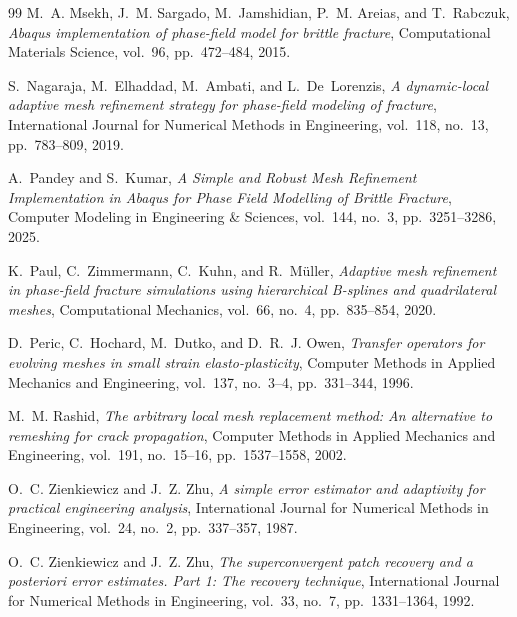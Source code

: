 \begin{thebibliography}{99}
M.~A. Msekh, J.~M. Sargado, M.~Jamshidian, P.~M. Areias, and T.~Rabczuk,
\textit{Abaqus implementation of phase-field model for brittle fracture},
Computational Materials Science,
vol.~96, pp.~472--484, 2015.

S.~Nagaraja, M.~Elhaddad, M.~Ambati, and L.~De~Lorenzis,
\textit{A dynamic-local adaptive mesh refinement strategy for phase-field modeling of fracture},
International Journal for Numerical Methods in Engineering,
vol.~118, no.~13, pp.~783--809, 2019.

A.~Pandey and S.~Kumar,
\textit{A Simple and Robust Mesh Refinement Implementation in Abaqus for Phase Field Modelling of Brittle Fracture},
Computer Modeling in Engineering \& Sciences,
vol.~144, no.~3, pp.~3251--3286, 2025.

K.~Paul, C.~Zimmermann, C.~Kuhn, and R.~M\"uller,
\textit{Adaptive mesh refinement in phase-field fracture simulations using hierarchical B-splines and quadrilateral meshes},
Computational Mechanics,
vol.~66, no.~4, pp.~835--854, 2020.

D.~Peric, C.~Hochard, M.~Dutko, and D.~R.~J. Owen,
\textit{Transfer operators for evolving meshes in small strain elasto-plasticity},
Computer Methods in Applied Mechanics and Engineering,
vol.~137, no.~3--4, pp.~331--344, 1996.

M.~M. Rashid,
\textit{The arbitrary local mesh replacement method: An alternative to remeshing for crack propagation},
Computer Methods in Applied Mechanics and Engineering,
vol.~191, no.~15--16, pp.~1537--1558, 2002.

O.~C. Zienkiewicz and J.~Z. Zhu,
\textit{A simple error estimator and adaptivity for practical engineering analysis},
International Journal for Numerical Methods in Engineering,
vol.~24, no.~2, pp.~337--357, 1987.

O.~C. Zienkiewicz and J.~Z. Zhu,
\textit{The superconvergent patch recovery and a posteriori error estimates. Part 1: The recovery technique},
International Journal for Numerical Methods in Engineering,
vol.~33, no.~7, pp.~1331--1364, 1992.

\end{thebibliography}
